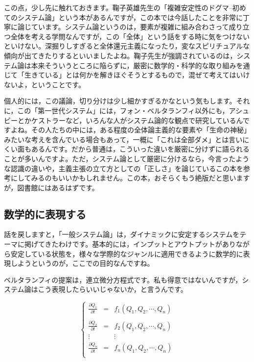 \documentclass{ltjsbook}
\begin{document}
この点，少し先に触れておきます。鞠子英雄先生の「複雑安定性のドグマ--初めてのシステム論」\parencite{Mariko199602}という本があるんですが，この本では今話したことを非常に丁寧に論じています。システム論というのは，要素が複雑に組み合わさって成り立つ全体を考える学問なんですが，この「全体」という話をする時に気をつけないといけない。深掘りしすぎると全体還元主義になったり，変なスピリチュアルな傾向が出てきたりするといいましたよね。鞠子先生が強調されているのは，システム論は本来そういうところに陥らずに，厳密に数学的・科学的な取り組みを通じて「生きている」とは何かを解きほぐそうとするもので，混ぜて考えてはいけないよ，ということです。

個人的には，この議論，切り分けは少し細かすぎるかなという気もします。それに，この「第一世代システム」には，フォン・ベルタランフィ以外にも，アシュビーとかケストラーなど，いろんな人がシステム論的な観点で研究しているんですよね。その人たちの中には，ある程度の全体論主義的な要素や「生命の神秘」みたいな考えを含んでいる場合もあって，一概に「これは全部ダメ」とは言いにくい面もあるんです。だから普通は，こういった違いを厳密に分けずに語られることが多いんですよ。ただ，システム論として厳密に分けるなら，今言ったような認識の違いや，主義主張の立て方としての「正しさ」を論じているこの本を参考にしてみるのもいいかもしれません。この本，おそらくもう絶版だと思いますが，図書館にはあるはずです。

\subsection{数学的に表現する}

話を戻しますと，「一般システム論」は，ダイナミックに安定するシステムをテーマに掲げてきたわけです。基本的には，インプットとアウトプットがありながら安定している状態を，様々な学際的なジャンルに適用できるように数学的に表現しようというのが，ここでの目的なんですね。

ベルタランフィの提案は，連立微分方程式です。私も得意ではないんですが，システム論はこう表現したらいいじゃないか，と言うんです。

\[
\left\{
    \begin{array}{ccc}
        \frac{\partial Q_1}{\partial t} &=& f_1(Q_1,Q_2,\cdots,Q_n)\\
        \\
        \frac{\partial Q_2}{\partial t} &=& f_2(Q_1,Q_2,\cdots,Q_n)\\
        \vdots & & \vdots\\
        \frac{\partial Q_n}{\partial t} &=& f_n(Q_1,Q_2,\cdots,Q_n)\\
    \end{array}
\right.
\]
\end{document}
